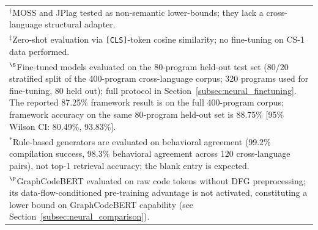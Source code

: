 \begin{table}[t]
\begin{tabular}{|l|c|c|c|c|c|c|}
\hline
\multicolumn{7}{p{0.98\linewidth}}{$^{\dagger}$MOSS and JPlag tested as non-semantic lower-bounds; they lack a cross-language structural adapter.} \\
\multicolumn{7}{p{0.98\linewidth}}{$^{\ddagger}$Zero-shot evaluation via \texttt{[CLS]}-token cosine similarity; no fine-tuning on CS-1 data performed.} \\
\multicolumn{7}{p{0.98\linewidth}}{$^{\S}$Fine-tuned models evaluated on the 80-program held-out test set (80/20 stratified split of the 400-program cross-language corpus; 320 programs used for fine-tuning, 80 held out); full protocol in Section~\ref{subsec:neural_finetuning}. The reported 87.25\% framework result is on the full 400-program corpus; framework accuracy on the same 80-program held-out set is 88.75\% [95\% Wilson CI: 80.49\%, 93.83\%].} \\
\multicolumn{7}{p{0.98\linewidth}}{$^{*}$Rule-based generators are evaluated on behavioral agreement (99.2\% compilation success, 98.3\% behavioral agreement across 120 cross-language pairs), not top-1 retrieval accuracy; the blank entry is expected.} \\
\multicolumn{7}{p{0.98\linewidth}}{$^{\P}$GraphCodeBERT evaluated on raw code tokens without DFG preprocessing; its data-flow-conditioned pre-training advantage is not activated, constituting a lower bound on GraphCodeBERT capability (see Section~\ref{subsec:neural_comparison}).} \\
\end{tabular}
\end{table}
